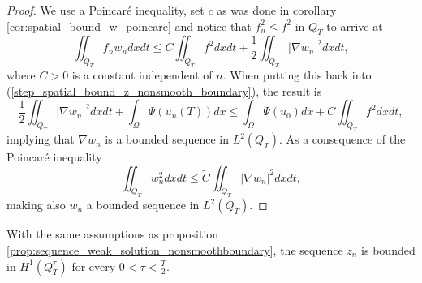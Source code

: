 \documentclass[11pt, a4paper]{article}
\begin{document}
\begin{proof}
We use a Poincaré inequality, set $c$ as was done in corollary \ref{cor:spatial_bound_w_poincare} and notice that $f_n^2 \leq f^2$ in $Q_T$ to arrive at
\begin{equation*}
\iint_{Q_T} f_n w_n dxdt \leq C\iint_{Q_T} f^2dxdt + \frac{1}{2}\iint_{Q_T} |\nabla w_n|^2 dxdt,
\end{equation*}
where $C >0$ is a constant independent of $n$. When putting this back into (\ref{step_spatial_bound_z_nonsmooth_boundary}), the result is
\begin{equation}
\frac{1}{2}\iint_{Q_T} |\nabla w_n|^2 dxdt + \int_\Omega \Psi(u_n(T))dx \leq \int_\Omega \Psi(u_0)dx + C\iint_{Q_T} f^2dxdt,
\end{equation}
implying that $\nabla w_n$ is a bounded sequence in $L^2(Q_T)$. As a consequence of the Poincaré inequality
\begin{equation*}
\iint_{Q_T} w_n^2 dxdt \leq \tilde{C} \iint_{Q_T} |\nabla w_n|^2 dxdt,
\end{equation*}
making also $w_n$ a bounded sequence in $L^2(Q_T)$.

\end{proof}

\begin{proposition}
\label{prop:z_n_bounded_in_H1}
With the same assumptions as proposition \ref{prop:sequence_weak_solution_nonsmoothboundary}, the sequence $z_n$ is bounded in $H^1(Q_T^\tau)$ for every $0 < \tau < \frac{T}{2}$.
\end{proposition}
\end{document}
